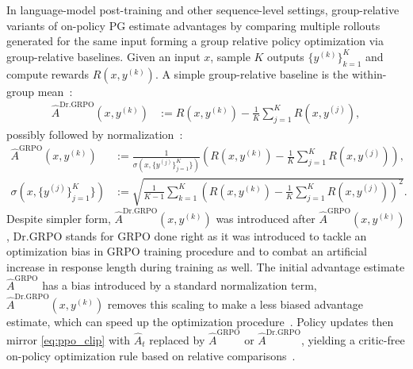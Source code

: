 \documentclass{article}
\numberwithin{equation}{section}
\begin{document}
In language-model post-training and other sequence-level settings, group-relative variants of on-policy PG estimate advantages by comparing multiple rollouts generated for the same input forming a group relative policy optimization via group-relative baselines. Given an input $x$, sample $K$ outputs $\{y^{(k)}\}_{k=1}^K$ and compute rewards $R(x,y^{(k)})$. {A simple group-relative baseline is the within-group mean~\cite{liu2025understanding}:
\begin{equation}\label{eq:dr_grpo_adv}
    \begin{aligned}
        \hat A^{\mathrm{Dr.GRPO}}(x,y^{(k)}) &:=R(x,y^{(k)})-\frac{1}{K}\sum_{j=1}^K R(x,y^{(j)}),
    \end{aligned}
\end{equation}
possibly followed by normalization~\cite{shao2024deepseekmath}:
\begin{equation}\label{eq:grpo_adv}
    \begin{aligned}
        \hat A^{\mathrm{GRPO}}(x,y^{(k)}) &:=\frac{1}{\sigma(x, \{y^{(j)}\}_{j = 1}^{K}\})}\left(R(x,y^{(k)})-\frac{1}{K}\sum_{j=1}^K R(x,y^{(j)})\right),\\
        \sigma(x, \{y^{(j)}\}_{j = 1}^{K}\}) &:=\sqrt{\frac{1}{K - 1}\sum\limits_{k = 1}^{K}\left(R(x, y^{(k)}) - \frac{1}{K}\sum\limits_{j = 1}^{K}R(x, y^{(j)})\right)^{2}}.
    \end{aligned}
\end{equation}
Despite simpler form, $\hat A^{\mathrm{Dr.GRPO}}(x,y^{(k)})$ was introduced after $\hat A^{\mathrm{GRPO}}(x,y^{(k)})$, Dr.GRPO stands for GRPO done right as it was introduced to tackle an optimization bias in GRPO training procedure and to combat an artificial increase in response length during training as well. The initial advantage estimate $\hat A^{\mathrm{GRPO}}$ has a bias introduced by a standard normalization term, $\hat A^{\mathrm{Dr.GRPO}}(x,y^{(k)})$ removes this scaling to make a less biased advantage estimate, which can speed up the optimization procedure~\cite{liu2025understanding}.} Policy updates then mirror \eqref{eq:ppo_clip} with $\hat A_t$ replaced by $\hat A^{\mathrm{GRPO}}$ or $\hat A^{\mathrm{Dr.GRPO}}$, yielding a critic-free on-policy optimization rule based on relative comparisons~\cite{yin2026rewardupdatedgrpo,liu2026regrpo}.
\end{document}
